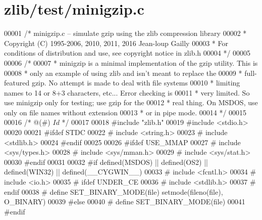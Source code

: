 \hypertarget{zlib_2test_2minigzip_8c_source}{}\section{zlib/test/minigzip.c}
\label{zlib_2test_2minigzip_8c_source}

\begin{DoxyCode}
00001 \textcolor{comment}{/* minigzip.c -- simulate gzip using the zlib compression library}
00002 \textcolor{comment}{ * Copyright (C) 1995-2006, 2010, 2011, 2016 Jean-loup Gailly}
00003 \textcolor{comment}{ * For conditions of distribution and use, see copyright notice in zlib.h}
00004 \textcolor{comment}{ */}
00005 
00006 \textcolor{comment}{/*}
00007 \textcolor{comment}{ * minigzip is a minimal implementation of the gzip utility. This is}
00008 \textcolor{comment}{ * only an example of using zlib and isn't meant to replace the}
00009 \textcolor{comment}{ * full-featured gzip. No attempt is made to deal with file systems}
00010 \textcolor{comment}{ * limiting names to 14 or 8+3 characters, etc... Error checking is}
00011 \textcolor{comment}{ * very limited. So use minigzip only for testing; use gzip for the}
00012 \textcolor{comment}{ * real thing. On MSDOS, use only on file names without extension}
00013 \textcolor{comment}{ * or in pipe mode.}
00014 \textcolor{comment}{ */}
00015 
00016 \textcolor{comment}{/* @(#) $Id$ */}
00017 
00018 \textcolor{preprocessor}{#include "zlib.h"}
00019 \textcolor{preprocessor}{#include <stdio.h>}
00020 
00021 \textcolor{preprocessor}{#ifdef STDC}
00022 \textcolor{preprocessor}{#  include <string.h>}
00023 \textcolor{preprocessor}{#  include <stdlib.h>}
00024 \textcolor{preprocessor}{#endif}
00025 
00026 \textcolor{preprocessor}{#ifdef USE\_MMAP}
00027 \textcolor{preprocessor}{#  include <sys/types.h>}
00028 \textcolor{preprocessor}{#  include <sys/mman.h>}
00029 \textcolor{preprocessor}{#  include <sys/stat.h>}
00030 \textcolor{preprocessor}{#endif}
00031 
00032 \textcolor{preprocessor}{#if defined(MSDOS) || defined(OS2) || defined(WIN32) || defined(\_\_CYGWIN\_\_)}
00033 \textcolor{preprocessor}{#  include <fcntl.h>}
00034 \textcolor{preprocessor}{#  include <io.h>}
00035 \textcolor{preprocessor}{#  ifdef UNDER\_CE}
00036 \textcolor{preprocessor}{#    include <stdlib.h>}
00037 \textcolor{preprocessor}{#  endif}
00038 \textcolor{preprocessor}{#  define SET\_BINARY\_MODE(file) setmode(fileno(file), O\_BINARY)}
00039 \textcolor{preprocessor}{#else}
00040 \textcolor{preprocessor}{#  define SET\_BINARY\_MODE(file)}
00041 \textcolor{preprocessor}{#endif}

\end{DoxyCode}
